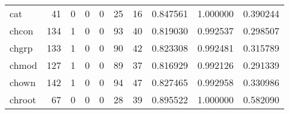 \begin{longtable}{lrrrrrrrrr}
cat       &                                        41 &                                                  0 &                                                  0 &                                                  0 &                                                 25 &                                                 16 &                                           0.847561 &                               1.000000 &                             0.390244 \\
chcon     &                                       134 &                                                  1 &                                                  0 &                                                  0 &                                                 93 &                                                 40 &                                           0.819030 &                               0.992537 &                             0.298507 \\
chgrp     &                                       133 &                                                  1 &                                                  0 &                                                  0 &                                                 90 &                                                 42 &                                           0.823308 &                               0.992481 &                             0.315789 \\
chmod     &                                       127 &                                                  1 &                                                  0 &                                                  0 &                                                 89 &                                                 37 &                                           0.816929 &                               0.992126 &                             0.291339 \\
chown     &                                       142 &                                                  1 &                                                  0 &                                                  0 &                                                 94 &                                                 47 &                                           0.827465 &                               0.992958 &                             0.330986 \\
chroot    &                                        67 &                                                  0 &                                                  0 &                                                  0 &                                                 28 &                                                 39 &                                           0.895522 &                               1.000000 &                             0.582090 \\

\end{longtable}
